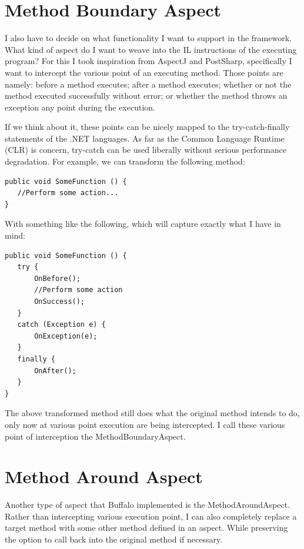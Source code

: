 \section{Method Boundary Aspect}
I also have to decide on what functionality I want to support in the framework. What kind of aspect do I want to weave into the IL instructions of the executing program? For this I took inspiration from AspectJ and PostSharp, specifically I want to intercept the various point of an executing method. Those points are namely: before a method executes; after a method executes; whether or not the method executed successfully without error; or whether the method throws an exception any point during the execution.

If we think about it, these points can be nicely mapped to the try-catch-finally statements of the .NET languages. As far as the Common Language Runtime (CLR) is concern, try-catch can be used liberally without serious performance degradation. For example, we can transform the following method:

\begin{lstlisting}[caption={Sample function}, label=samplefunction]
public void SomeFunction () {
   //Perform some action...
}
\end{lstlisting}

With something like the following, which will capture exactly what I have in mind:

\begin{lstlisting}[caption={Sample try-cath-finally}, label=sampletcf]
public void SomeFunction () {
   try {
       OnBefore();
       //Perform some action
       OnSuccess();
   }
   catch (Exception e) {
       OnException(e);
   }
   finally {
       OnAfter();
   }
}
\end{lstlisting}

The above transformed method still does what the original method intends to do, only now at various point execution are being intercepted. I call these various point of interception the MethodBoundaryAspect.

\section{Method Around Aspect}
Another type of aspect that Buffalo implemented is the MethodAroundAspect. Rather than intercepting various execution point, I can also completely replace a target method with some other method defined in an aspect. While preserving the option to call back into the original method if necessary.

